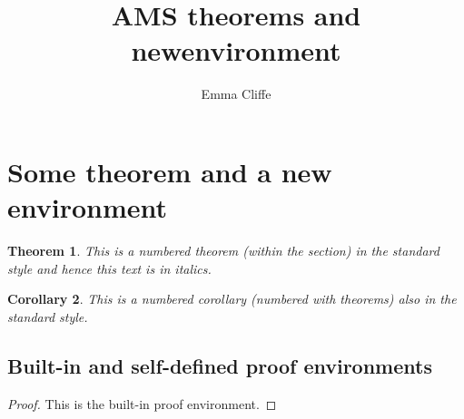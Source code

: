 \usepackage[mathscr]{eucal}
\usepackage{eufrak} 
\usepackage{longtable} 
\usepackage{verbatim} 
\usepackage{url} 
\newtheorem{theorem}{Theorem}[section]
\newtheorem{corollary}[theorem]{Corollary}
\theoremstyle{definition}
\newtheorem{definition}{Definition}[section]
\theoremstyle{remark}
\newtheorem*{note}{Note}
\newenvironment{ProofOri}{\noindent{\bf Proof.}\hspace*{1em}}{\qed\par}

\title{AMS theorems and newenvironment}
\author{Emma Cliffe}
\date{}
\pagestyle{headings}

\maketitle

\section{Some theorem and a new environment}

\begin{theorem}
This is a numbered theorem (within the section) in the standard style and hence this text is in italics. 
\end{theorem}

\begin{corollary}
This is a numbered corollary (numbered with theorems) also in the standard style.
\end{corollary}

\subsection{Built-in and self-defined proof environments}

\begin{proof}
This is the built-in proof environment.
\end{proof}


